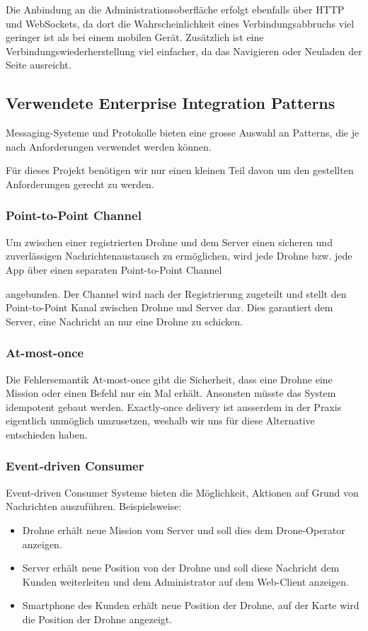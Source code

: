 {Die Anbindung an die Administrationsoberfläche erfolgt ebenfalls über HTTP und WebSockets, da dort die Wahrscheinlichkeit eines Verbindungsabbruchs viel geringer ist als bei einem mobilen Gerät. Zusätzlich ist eine Verbindungswiederherstellung viel einfacher, da das Navigieren oder Neuladen der Seite ausreicht. \\


\subsection{Verwendete Enterprise Integration Patterns}
Messaging-Systeme und Protokolle bieten eine grosse Auswahl an Patterns, die je nach Anforderungen verwendet werden können. {\cite{EIP} Für dieses Projekt benötigen wir nur einen kleinen Teil davon um den gestellten Anforderungen gerecht zu werden.
%
\subsubsection{Point-to-Point Channel}
Um zwischen einer registrierten Drohne und dem Server einen sicheren und zuverlässigen Nachrichtenaustausch zu ermöglichen, wird jede Drohne bzw. jede App über einen separaten Point-to-Point Channel	\cite[S. 103]{EIP}} angebunden. Der Channel wird nach der Registrierung zugeteilt und stellt den Point-to-Point Kanal zwischen Drohne und Server dar. Dies garantiert dem Server, eine Nachricht an nur eine Drohne zu schicken.
%
\subsubsection{At-most-once}

Die Fehlersemantik At-most-once gibt die Sicherheit, dass eine Drohne eine Mission oder einen Befehl nur ein Mal erhält. Ansonsten müsste das System idempotent gebaut werden. Exactly-once delivery ist ausserdem in der Praxis eigentlich unmöglich umzusetzen, weshalb wir uns für diese Alternative entschieden haben. 
%
\subsubsection{Event-driven Consumer}
{Event-driven Consumer \cite[S. 442]{EIP}} Systeme bieten die Möglichkeit, Aktionen auf Grund von Nachrichten auszuführen. Beispielsweise:

\begin{itemize}
	\item Drohne erhält neue Mission vom Server und soll dies dem Drone-Operator anzeigen.
	\item Server erhält neue Position von der Drohne und soll diese Nachricht dem Kunden weiterleiten und dem Administrator auf dem Web-Client anzeigen.
	\item Smartphone des Kunden erhält neue Position der Drohne, auf der Karte wird die Position der Drohne angezeigt.
\end{itemize}

}
